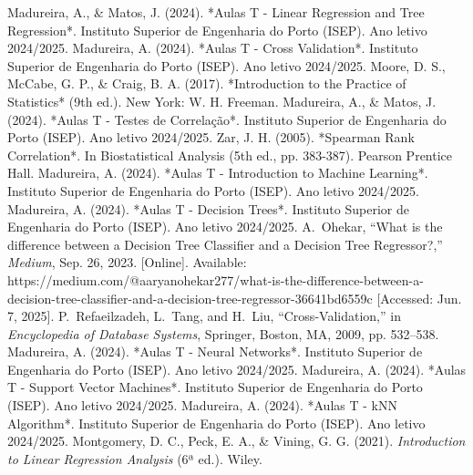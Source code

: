 \documentclass[conference]{IEEEtran}
\begin{document}
\begin{thebibliography}{00}
Madureira, A., \& Matos, J. (2024). *Aulas T - Linear Regression and Tree Regression*. Instituto Superior de Engenharia do Porto (ISEP). Ano letivo 2024/2025.
Madureira, A. (2024). *Aulas T - Cross Validation*. Instituto Superior de Engenharia do Porto (ISEP). Ano letivo 2024/2025.
Moore, D. S., McCabe, G. P., \& Craig, B. A. (2017). *Introduction to the Practice of Statistics* (9th ed.). New York: W. H. Freeman.
Madureira, A., \& Matos, J. (2024). *Aulas T - Testes de Correlação*. Instituto Superior de Engenharia do Porto (ISEP). Ano letivo 2024/2025.
Zar, J. H. (2005). *Spearman Rank Correlation*. In Biostatistical Analysis (5th ed., pp. 383-387). Pearson Prentice Hall.
Madureira, A. (2024). *Aulas T - Introduction to Machine Learning*. Instituto Superior de Engenharia do Porto (ISEP). Ano letivo 2024/2025.
Madureira, A. (2024). *Aulas T - Decision Trees*. Instituto Superior de Engenharia do Porto (ISEP). Ano letivo 2024/2025.
A.~Ohekar, ``What is the difference between a Decision Tree Classifier and a Decision Tree Regressor?,'' \emph{Medium}, Sep. 26, 2023. [Online]. Available: https://medium.com/@aaryanohekar277/what-is-the-difference-between-a-decision-tree-classifier-and-a-decision-tree-regressor-36641bd6559c [Accessed: Jun. 7, 2025].
P.~Refaeilzadeh, L.~Tang, and H.~Liu, ``Cross-Validation,'' in \emph{Encyclopedia of Database Systems}, Springer, Boston, MA, 2009, pp. 532--538.
Madureira, A. (2024). *Aulas T - Neural Networks*. Instituto Superior de Engenharia do Porto (ISEP). Ano letivo 2024/2025.
Madureira, A. (2024). *Aulas T - Support Vector Machines*. Instituto Superior de Engenharia do Porto (ISEP). Ano letivo 2024/2025.
Madureira, A. (2024). *Aulas T - kNN Algorithm*. Instituto Superior de Engenharia do Porto (ISEP). Ano letivo 2024/2025.
Montgomery, D. C., Peck, E. A., \& Vining, G. G. (2021). 
\textit{Introduction to Linear Regression Analysis} (6ª ed.). Wiley.




\end{thebibliography}
\end{document}
